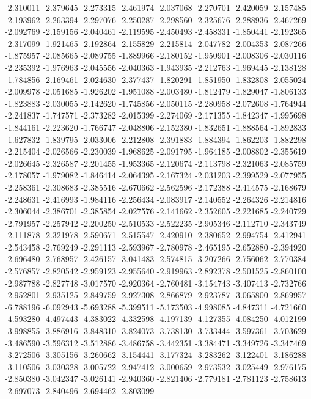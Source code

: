 -2.310011
-2.379645
-2.273315
-2.461974
-2.037068
-2.270701
-2.420059
-2.157485
-2.193962
-2.263394
-2.297076
-2.250287
-2.298560
-2.325676
-2.288936
-2.467269
-2.092769
-2.159156
-2.040461
-2.119595
-2.450493
-2.458331
-1.850441
-2.192365
-2.317099
-1.921465
-2.192864
-2.155829
-2.215814
-2.047782
-2.004353
-2.087266
-1.875957
-2.085665
-2.089755
-1.889966
-2.180152
-1.950901
-2.008306
-2.030116
-2.235392
-1.976963
-2.045556
-2.040363
-1.943935
-2.212763
-1.969445
-2.138128
-1.784856
-2.169461
-2.024630
-2.377437
-1.820291
-1.851950
-1.832808
-2.055024
-2.009978
-2.051685
-1.926202
-1.951088
-2.003480
-1.812479
-1.829047
-1.806133
-1.823883
-2.030055
-2.142620
-1.745856
-2.050115
-2.280958
-2.072608
-1.764944
-2.241837
-1.747571
-2.373282
-2.015399
-2.274069
-2.171355
-1.842347
-1.995698
-1.844161
-2.223620
-1.766747
-2.048806
-2.152380
-1.832651
-1.888564
-1.892833
-1.627832
-1.839795
-2.033006
-2.212808
-2.391883
-1.884394
-1.862203
-1.882298
-2.215404
-2.026566
-2.230039
-1.968625
-2.091795
-1.964185
-2.008802
-2.355619
-2.026645
-2.326587
-2.201455
-1.953365
-2.120674
-2.113798
-2.321063
-2.085759
-2.178057
-1.979082
-1.846414
-2.064395
-2.167324
-2.031203
-2.399529
-2.077955
-2.258361
-2.308683
-2.385516
-2.670662
-2.562596
-2.172388
-2.414575
-2.168679
-2.248631
-2.416993
-1.984116
-2.256434
-2.083917
-2.140552
-2.264326
-2.214816
-2.306044
-2.386701
-2.385854
-2.027576
-2.141662
-2.352605
-2.221685
-2.240729
-2.791957
-2.257942
-2.200250
-2.510533
-2.522235
-2.905346
-2.112710
-2.343749
-2.111878
-2.321978
-2.590671
-2.515547
-2.420910
-2.380652
-2.994754
-2.412941
-2.543458
-2.769249
-2.291113
-2.593967
-2.780978
-2.465195
-2.652880
-2.394920
-2.696480
-2.768957
-2.426157
-3.041483
-2.574815
-3.207266
-2.756062
-2.770384
-2.576857
-2.820542
-2.959123
-2.955640
-2.919963
-2.892378
-2.501525
-2.860100
-2.987788
-2.827748
-3.017570
-2.920364
-2.760481
-3.154743
-3.407413
-2.732766
-2.952801
-2.935125
-2.849759
-2.927308
-2.866879
-2.923787
-3.065800
-2.869957
-6.788196
-6.092943
-5.693288
-5.399511
-5.173503
-4.998085
-4.847311
-4.721660
-4.593280
-4.497443
-4.383022
-4.332598
-4.197139
-4.127355
-4.084250
-4.012199
-3.998855
-3.886916
-3.848310
-3.824073
-3.738130
-3.733444
-3.597361
-3.703629
-3.486590
-3.596312
-3.512886
-3.486758
-3.442351
-3.384471
-3.349726
-3.347469
-3.272506
-3.305156
-3.260662
-3.154441
-3.177324
-3.283262
-3.122401
-3.186288
-3.110506
-3.030328
-3.005722
-2.947412
-3.000659
-2.973532
-3.025449
-2.976175
-2.850380
-3.042347
-3.026141
-2.940360
-2.821406
-2.779181
-2.781123
-2.758613
-2.697073
-2.840496
-2.694462
-2.803099

